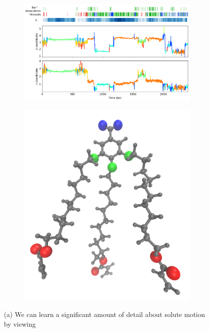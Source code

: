 \documentclass{article}
\begin{document}
  \begin{figure}
  \centering
  \begin{subfigure}{0.75\textwidth}
  \includegraphics[width=\textwidth]{mechanism_map.png}
  \caption{}
  \end{subfigure}
  \begin{subfigure}{0.24\textwidth}
  \includegraphics[width=\textwidth]{monomer_oxygens.png}
  \caption{}
  \end{subfigure}
  \caption{(a) We can learn a significant amount of detail about solute motion by viewing 
}
\end{figure}
\end{document}
